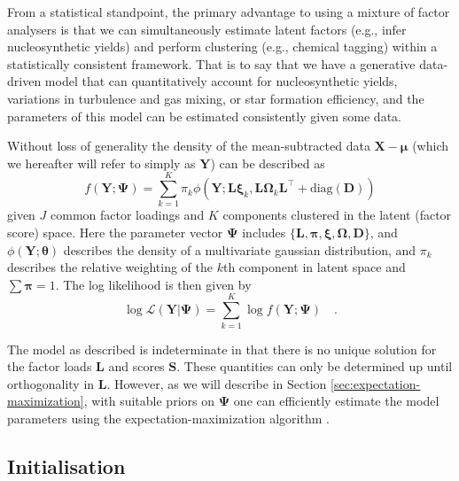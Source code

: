 \documentclass[twocolumn]{aastex62}
\newcommand{\vect}[1]{\boldsymbol{\mathbf{#1}}}
\renewcommand{\vec}[1]{\vect{#1}}
\newcommand{\weight}{\pi}
\newcommand{\data}{\textbf{Y}}
\newcommand{\vecdata}{\vec\data}
\newcommand{\vecdataunscaled}{\vec{X}}
\newcommand{\diag}[1]{\textrm{diag}(#1)}
\newcommand{\transpose}{^\intercal}
\newcommand{\eye}{\textbf{I}}
\newcommand{\factorloads}{\textbf{L}}
\newcommand{\factorscores}{\textbf{S}}
\newcommand{\specificvariance}{\vec{D}}
\newcommand{\scoremeans}{\vec\xi}
\newcommand{\scorecovs}{\vec\Omega}
\newcommand{\NumLatentFactors}{J}
\newcommand{\NumComponents}{K}
\newcommand{\numcomponents}{k}
\begin{document}
From a statistical standpoint, the primary advantage to using
a mixture of factor analysers is that we can simultaneously
estimate latent factors (e.g., infer nucleosynthetic 
yields) and perform clustering (e.g., chemical tagging) 
within a statistically consistent framework. That is to say
that we have a generative data-driven model that can 
quantitatively account for nucleosynthetic yields, variations in
turbulence and gas mixing, or star formation efficiency,
and the parameters of this model can be estimated consistently
given some data.

Without loss of generality the density of the mean-subtracted 
data $\vecdataunscaled - \vec\mu$ (which we hereafter will refer to simply as $\vecdata$) can be described as
\begin{equation}
	f(\vecdata; \vec\Psi) = \sum_{\numcomponents=1}^{\NumComponents}\weight_\numcomponents\phi(\vecdata;\factorloads\scoremeans_\numcomponents, \factorloads\scorecovs_\numcomponents\factorloads\transpose + \diag{\specificvariance})
\end{equation}
\noindent{}given $\NumLatentFactors$ common factor loadings and $\NumComponents$ components
clustered in the latent (factor score) space. Here the parameter
vector
$\vec\Psi$ includes $\{\factorloads,\vec\pi,\scoremeans,\scorecovs,\specificvariance\}$, and $\phi(\vecdata; \vec\theta)$
describes the density of a multivariate gaussian distribution,
and $\weight_\numcomponents$ describes the relative weighting of the $\numcomponents$th
component in latent space and $\sum\vec\weight = 1$.
The log likelihood is then given by
\begin{equation}
	\log\mathcal{L}(\vecdata|\vec\Psi) = \sum_{\numcomponents=1}^{\NumComponents}\log{f(\vecdata;\vec\Psi)} \quad . \label{eq:log-likelihood}
\end{equation}


The model as described is indeterminate in that there is no unique 
solution for the factor loads $\factorloads$ and scores
$\factorscores$. These quantities can only be determined up until 
orthogonality in $\factorloads$. However, as we will describe in Section \ref{sec:expectation-maximization}, with suitable priors on $\vec\Psi$ 
one can efficiently estimate the model parameters using the expectation-maximization
algorithm \citep{Dempster:1977}. 


\subsection{Initialisation} \label{sec:initialisation}
\end{document}
